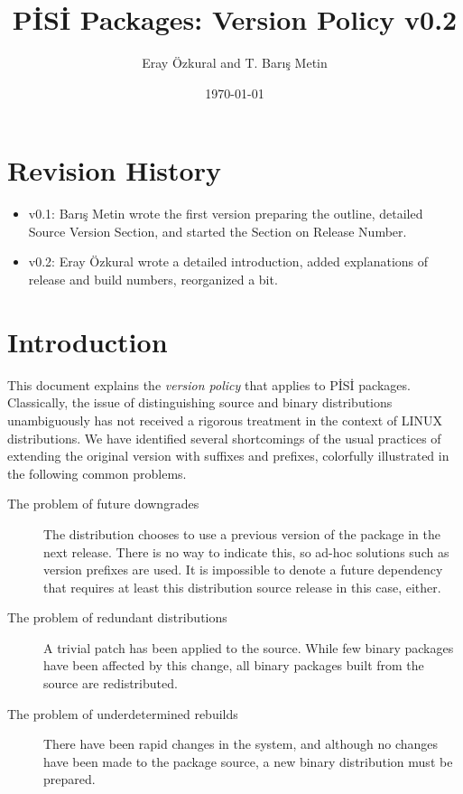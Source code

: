 \documentclass[a4paper,11pt]{article}
\title{P\.IS\.I Packages: Version Policy v0.2}
\date{\today}
\author{Eray \"Ozkural and T. Bar\i{}\c s Metin}
\begin{document}
\maketitle

\section*{Revision History}
\begin{itemize}
\item v0.1: Bar\i\c s Metin wrote the first version preparing the outline,
detailed Source Version Section, and started the Section on Release Number.
\item v0.2: Eray \"Ozkural wrote a detailed introduction, added
  explanations of release and build numbers, reorganized a bit.
\end{itemize}

\section{Introduction}

This document explains the \emph{version policy} that applies to 
P\.IS\.I packages. Classically, the issue of distinguishing source and
binary distributions unambiguously has not received a rigorous
treatment in the context of LINUX distributions. We have identified
several shortcomings of the usual practices of extending the original
version with suffixes and prefixes, colorfully illustrated in the
following common problems.

\begin{description}

\item[The problem of future downgrades]
The distribution chooses to use a previous version of the package in
the next release. There is no way to indicate this, so ad-hoc
solutions such as version prefixes are used. It is
impossible to denote a future dependency that requires at least this
distribution source release in this case, either.

\item[The problem of redundant distributions]
A trivial patch has been applied to the source. While few binary
packages have been affected by this change, all binary packages
built from the source are redistributed.

\item[The problem of underdetermined rebuilds]
There have been rapid changes in the system, and although no
changes have been made to the package source, a new binary 
distribution must be prepared.

\end{description}
\end{document}
